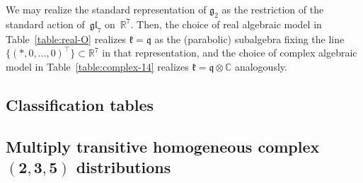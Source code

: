 \documentclass[10pt,a4paper]{amsart}
\newcommand{\bbC}{\mathbb{C}}
\newcommand{\bbR}{\mathbb{R}}
\newcommand{\mfg} {\mathfrak{g}}
\newcommand{\mfh} {\mathfrak{h}}
\newcommand{\mfk} {\mathfrak{k}}
\newcommand{\mfq} {\mathfrak{q}}
\newcommand{\mfgl} {\mathfrak{gl}}
\numberwithin{equation}{section}
\begin{document}
We may realize the standard representation of $\mfg_2$ as the restriction of the standard action of~$\mfgl_7$ on~$\bbR^7$. Then, the choice of real algebraic model in Table~\ref{table:real-O} realizes $\mfk = \mfq$ as the (parabolic) subalgebra fixing the line $\big\{(\ast, 0, \ldots, 0)^{\top}\big\} \subset \bbR^7$ in that representation, and the choice of complex algebraic model in Table~\ref{table:complex-14} realizes $\mfk = \mfq \otimes \bbC$ analogously.

\newpage

\begin{landscape}

\section{Classification tables}\label{appendixB}

\subsection[Multiply transitive homogeneous complex $(2, 3, 5)$ distributions]{Multiply transitive homogeneous complex $\boldsymbol{(2, 3, 5)}$ distributions}

\begin{table}[htb]
\caption{Multiply transitive homogeneous complex $(2, 3, 5)$ distributions: $\dim \mfh = 14$.}\label{table:complex-14}\vspace{1mm}


\end{table}
\end{landscape}
\end{document}
